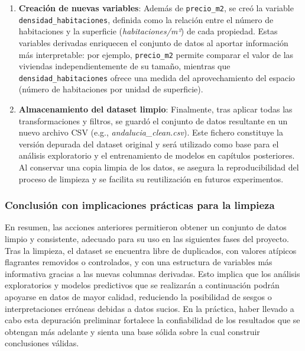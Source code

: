 \begin{enumerate}
\item \textbf{Creación de nuevas variables}: Además de \texttt{precio\_m2}, se creó la variable \texttt{densidad\_habitaciones}, definida como la relación entre el número de habitaciones y la superficie (\emph{habitaciones/m²}) de cada propiedad. Estas variables derivadas enriquecen el conjunto de datos al aportar información más interpretable: por ejemplo, \texttt{precio\_m2} permite comparar el valor de las viviendas independientemente de su tamaño, mientras que \texttt{densidad\_habitaciones} ofrece una medida del aprovechamiento del espacio (número de habitaciones por unidad de superficie).

\item \textbf{Almacenamiento del dataset limpio}: Finalmente, tras aplicar todas las transformaciones y filtros, se guardó el conjunto de datos resultante en un nuevo archivo CSV (e.g., \emph{andalucia\_clean.csv}). Este fichero constituye la versión depurada del dataset original y será utilizado como base para el análisis exploratorio y el entrenamiento de modelos en capítulos posteriores. Al conservar una copia limpia de los datos, se asegura la reproducibilidad del proceso de limpieza y se facilita su reutilización en futuros experimentos.
\end{enumerate}

\subsubsection{Conclusión con implicaciones prácticas para la limpieza}
En resumen, las acciones anteriores permitieron obtener un conjunto de datos limpio y consistente, adecuado para su uso en las siguientes fases del proyecto. Tras la limpieza, el dataset se encuentra libre de duplicados, con valores atípicos flagrantes removidos o controlados, y con una estructura de variables más informativa gracias a las nuevas columnas derivadas. Esto implica que los análisis exploratorios y modelos predictivos que se realizarán a continuación podrán apoyarse en datos de mayor calidad, reduciendo la posibilidad de sesgos o interpretaciones erróneas debidas a datos sucios. En la práctica, haber llevado a cabo esta depuración preliminar fortalece la confiabilidad de los resultados que se obtengan más adelante y sienta una base sólida sobre la cual construir conclusiones válidas.
